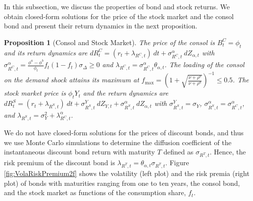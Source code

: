 \documentclass[preprint,11pt,authoryear]{elsarticle}
\theoremstyle{plain}
\newtheorem{prop}{Proposition}
\begin{document}
In this subsection, we discuss the properties of bond and stock returns. We obtain closed-form solutions for the price of the stock market and the consol bond and present their return dynamics in the next proposition. 
%
\begin{prop}[Consol and Stock Market]\label{prop:stockmarket}
The price of the consol is $B_t^C=\phi_t$ and its return dynamics are $ d R^C_t = \left( r_t + \lambda_{R^C,t} \right) \: dt + \sigma_{R^C,t}^{\alpha} \: dZ_{\alpha,t}$ with $\sigma_{R^C,t}^{\alpha}    = \frac{\phi^a - \phi^b}{\phi_t}  f_t \left(1-f_t\right)  \sigma_{\Delta} \geq 0$ and  $\lambda_{R^C,t} = \sigma_{R^C,t}^{\alpha} \theta_{\alpha,t}$.
The loading of the consol on the demand shock attains its maximum at $f_{\text{max}}=\left(1+\sqrt{\frac{\nu+ \rho^b}{\nu+ \rho^a}}\right)^{-1}\leq 0.5$. The stock market price is $\phi_t Y_t$ and the return dynamics are $d R^S_t = \left( r_t + \lambda_{R^S,t} \right) \: dt + \sigma^Y_{R^S,t} \: dZ_{Y,t}+  \sigma_{R^S,t}^{\alpha} \: dZ_{\alpha,t}$ with $\sigma^Y_{R^S,t} = \sigma_Y$, $\sigma_{R^S,t}^{\alpha} = \sigma_{R^C,t}^{\alpha}$, and $\lambda_{R^S,t} = \sigma_Y^2  + \lambda^{\alpha}_{R^C,t}$.
\end{prop}
%
We do not have closed-form solutions for the prices of discount bonds, and thus we use Monte Carlo simulations to determine the diffusion coefficient of the instantaneous discount bond return with maturity $T$ defined as $\sigma_{R^T,t}$. Hence, the risk premium of the discount bond is $\lambda_{R^T,t} = \theta_{\alpha,t}\sigma_{R^T,t}$. Figure \ref{fig:VolaRiskPremium2f} shows the volatility (left plot) and the risk premia (right plot) of bonds with maturities ranging from one to ten years, the consol bond, and the stock market as functions of the consumption share, $f_t$. %
\end{document}
